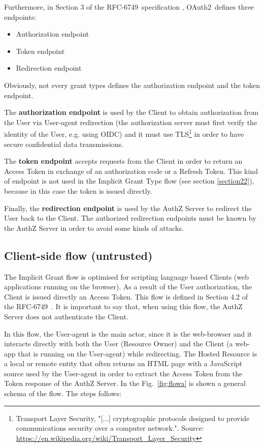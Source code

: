 \documentclass[a4paper,12pt]{article}
\def\eg{e.g.\xspace}
\def\oauth{OAuth2\xspace}
\def\myfig#1{Fig.~#1\xspace}
\def\rfc#1{RFC-#1\xspace}
\begin{document}
Furthermore, in Section 3 of the \rfc{6749}\ specification \cite{RFC6749}, \oauth\ defines three endpoints:

\begin{itemize}
    \item Authorization endpoint
    \item Token endpoint
    \item Redirection endpoint
\end{itemize}

Obviously, not every grant types defines the authorization endpoint and the token endpoint.

The \textbf{authorization endpoint} is used by the Client to obtain authorization from the User via User-agent redirection (the authorization server must first verify the identity of the User, \eg using OIDC) and it must use TLS\footnote{Transport Layer Security, "[...] cryptographic protocols designed to provide communications security over a computer network.". Source: \url{https://en.wikipedia.org/wiki/Transport_Layer_Security}} in order to have secure confidential data transmissions.

The \textbf{token endpoint} accepts requests from the Client in order to return an Access Token in exchange of an authorization code or a Refresh Token. This kind of endpoint is not used in the Implicit Grant Type flow (see section \ref{section22}), because in this case the token is issued directly.

Finally, the \textbf{redirection endpoint} is used by the AuthZ Server to redirect the User back to the Client. The authorized redirection endpoints must be known by the AuthZ Server in order to avoid some kinds of attacks.

\subsection{Client-side flow (untrusted)}
The Implicit Grant flow is optimised for scripting language based Clients (web applications running on the browser). As a result of the User authorization, the Client is issued directly an Access Token. This flow is defined in Section 4.2 of the \rfc{6749}\ \cite{RFC6749}. It is important to say that, when using this flow, the AuthZ Server does not authenticate the Client. 

In this flow, the User-agent is the main actor, since it is the web-browser and it interacts directly with both the User (Resource Owner) and the Client (a web-app that is running on the User-agent) while redirecting. The Hosted Resource is a local or remote entity that often returns an HTML page with a JavaScript source used by the User-agent in order to extract the Access Token from the Token response of the AuthZ Server. In the \myfig{\ref{fig:flowa}} is shown a general schema of the flow. The steps follows:
\end{document}
